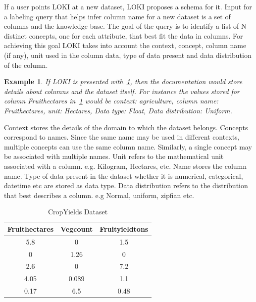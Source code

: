 \documentclass{vldb}
\begin{document}
If a user points LOKI at a new dataset, LOKI proposes a schema for it. Input for a labeling query that helps infer column name for a new dataset is a set of columns and the knowledge base. The goal of the query is to identify a list of N distinct concepts, one for each attribute, that best fit the data in columns. For achieving this goal LOKI takes into account the context, concept, column name (if any), unit used in the column data, type of data present and data distribution of the column. 

\newtheorem{exmp}{Example}[section]
\begin{exmp}
	If LOKI is presented with~\ref{CropYields Dataset}, then the documentation would store details about columns and the dataset itself. For instance the values stored for column Fruithectares in~\ref{CropYields Dataset} would be context: agriculture, column name: Fruithectares, unit: Hectares, Data type: Float, Data distribution: Uniform.
\end{exmp}

Context stores the details of the domain to which the dataset belongs. Concepts correspond to names. Since the same name may be used in different contexts, multiple concepts can use the same column name. Similarly, a single concept may be associated with multiple names.
Unit refers to the mathematical unit associated with a column. e.g. Kilogram, Hectares, etc. Name stores the column name. Type of data present in the dataset whether it is numerical, categorical, datetime etc are stored as data type. Data distribution refers to the distribution that best describes a column. e.g Normal, uniform, zipfian etc.

\begin{table}
	\label{CropYields Dataset}
	\begin{center}
		\begin{tabular}{||c c c||} 
			\hline
			Fruithectares & Vegcount & Fruityieldtons \\ [0.5ex]
			\hline\hline
			5.8 & 0 & 1.5 \\ 
			\hline
			0 & 1.26 & 0 \\
			\hline
			2.6 & 0 & 7.2 \\
			\hline
			4.05 & 0.089 & 1.1 \\
			\hline
			0.17 & 6.5 & 0.48 \\ [1ex] 
			\hline
		\end{tabular}
	\end{center}
	\caption{CropYields Dataset}
\end{table}
\end{document}
